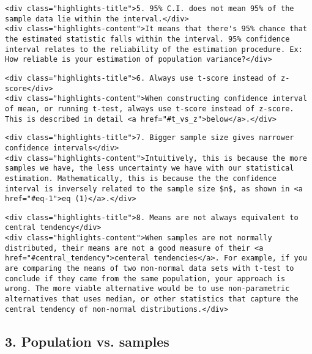 \documentclass[11pt]{article}
\begin{document}
\hypertarget{key5}{}
\begin{verbatim}
<div class="highlights-title">5. 95% C.I. does not mean 95% of the sample data lie within the interval.</div>
<div class="highlights-content">It means that there's 95% chance that the estimated statistic falls within the interval. 95% confidence interval relates to the reliability of the estimation procedure. Ex: How reliable is your estimation of population variance?</div>
\end{verbatim}

\hypertarget{key6}{}
\begin{verbatim}
<div class="highlights-title">6. Always use t-score instead of z-score</div>
<div class="highlights-content">When constructing confidence interval of mean, or running t-test, always use t-score instead of z-score. This is described in detail <a href="#t_vs_z">below</a>.</div>
\end{verbatim}

\hypertarget{key7}{}
\begin{verbatim}
<div class="highlights-title">7. Bigger sample size gives narrower confidence intervals</div>
<div class="highlights-content">Intuitively, this is because the more samples we have, the less uncertainty we have with our statistical estimation. Mathematically, this is because the the confidence interval is inversely related to the sample size $n$, as shown in <a href="#eq-1">eq (1)</a>.</div>
\end{verbatim}

\hypertarget{key8}{}
\begin{verbatim}
<div class="highlights-title">8. Means are not always equivalent to central tendency</div>
<div class="highlights-content">When samples are not normally distributed, their means are not a good measure of their <a href="#central_tendency">centeral tendencies</a>. For example, if you are comparing the means of two non-normal data sets with t-test to conclude if they came from the same population, your approach is wrong. The more viable alternative would be to use non-parametric alternatives that uses median, or other statistics that capture the central tendency of non-normal distributions.</div>
\end{verbatim}

    \hypertarget{population_vs_samples}{}

\subsection{3. Population vs. samples}\label{population-vs.-samples}
\end{document}
